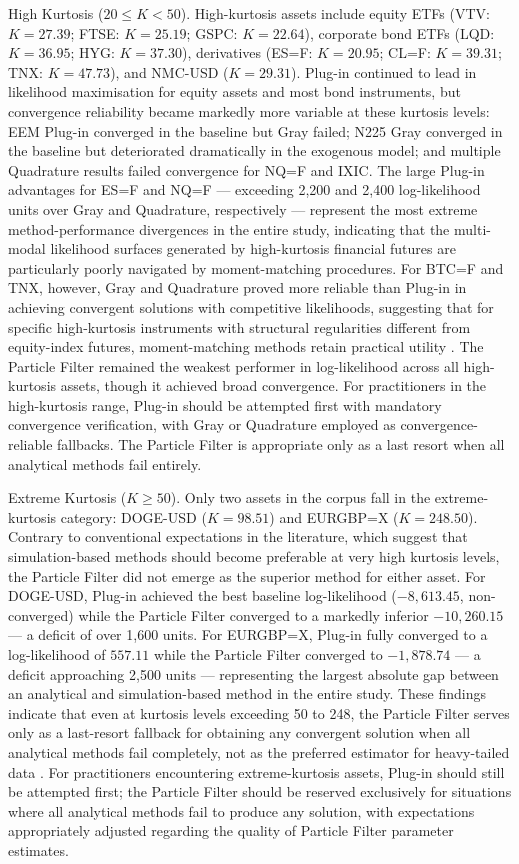 \documentclass[12pt, a4paper]{article}
\begin{document}
High Kurtosis ($20 \le K < 50$).
High-kurtosis assets include equity ETFs (VTV: $K = 27.39$; FTSE: $K = 25.19$; GSPC: $K = 22.64$), corporate bond ETFs (LQD: $K = 36.95$; HYG: $K = 37.30$), derivatives (ES=F: $K = 20.95$; CL=F: $K = 39.31$; TNX: $K = 47.73$), and NMC-USD ($K = 29.31$). Plug-in continued to lead in likelihood maximisation for equity assets and most bond instruments, but convergence reliability became markedly more variable at these kurtosis levels: EEM Plug-in converged in the baseline but Gray failed; N225 Gray converged in the baseline but deteriorated dramatically in the exogenous model; and multiple Quadrature results failed convergence for NQ=F and IXIC. The large Plug-in advantages for ES=F and NQ=F — exceeding 2{,}200 and 2{,}400 log-likelihood units over Gray and Quadrature, respectively — represent the most extreme method-performance divergences in the entire study, indicating that the multi-modal likelihood surfaces generated by high-kurtosis financial futures are particularly poorly navigated by moment-matching procedures. For BTC=F and TNX, however, Gray and Quadrature proved more reliable than Plug-in in achieving convergent solutions with competitive likelihoods, suggesting that for specific high-kurtosis instruments with structural regularities different from equity-index futures, moment-matching methods retain practical utility \citep{Haas2004}. The Particle Filter remained the weakest performer in log-likelihood across all high-kurtosis assets, though it achieved broad convergence. For practitioners in the high-kurtosis range, Plug-in should be attempted first with mandatory convergence verification, with Gray or Quadrature employed as convergence-reliable fallbacks. The Particle Filter is appropriate only as a last resort when all analytical methods fail entirely.

Extreme Kurtosis ($K \ge 50$).
Only two assets in the corpus fall in the extreme-kurtosis category: DOGE-USD ($K = 98.51$) and EURGBP=X ($K = 248.50$). Contrary to conventional expectations in the literature, which suggest that simulation-based methods should become preferable at very high kurtosis levels, the Particle Filter did not emerge as the superior method for either asset. For DOGE-USD, Plug-in achieved the best baseline log-likelihood ($-8{,}613.45$, non-converged) while the Particle Filter converged to a markedly inferior $-10{,}260.15$ — a deficit of over 1{,}600 units. For EURGBP=X, Plug-in fully converged to a log-likelihood of $557.11$ while the Particle Filter converged to $-1{,}878.74$ — a deficit approaching 2{,}500 units — representing the largest absolute gap between an analytical and simulation-based method in the entire study. These findings indicate that even at kurtosis levels exceeding 50 to 248, the Particle Filter serves only as a last-resort fallback for obtaining any convergent solution when all analytical methods fail completely, not as the preferred estimator for heavy-tailed data \citep{Doucet2001, Pitt1999}. For practitioners encountering extreme-kurtosis assets, Plug-in should still be attempted first; the Particle Filter should be reserved exclusively for situations where all analytical methods fail to produce any solution, with expectations appropriately adjusted regarding the quality of Particle Filter parameter estimates.
\end{document}
